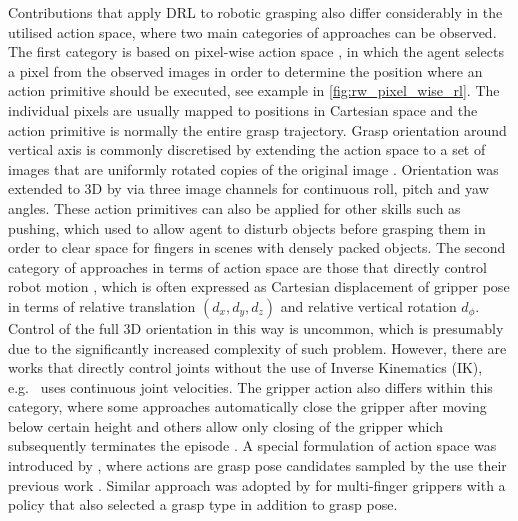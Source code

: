 Contributions that apply DRL to robotic grasping also differ considerably in the utilised action space, where two main categories of approaches can be observed. The first category is based on pixel-wise action space \cite{zeng_learning_2018, gualtieri_learning_2018, liu_active_2019, daniel_deep_2020, wu_generative_2020}, in which the agent selects a pixel from the observed images in order to determine the position where an action primitive should be executed, see example in \autoref{fig:rw_pixel_wise_rl}. The individual pixels are usually mapped to positions in Cartesian space and the action primitive is normally the entire grasp trajectory. Grasp orientation around vertical axis is commonly discretised by extending the action space to a set of images that are uniformly rotated copies of the original image \cite{zeng_learning_2018, daniel_deep_2020}. Orientation was extended to 3D by \citet{wu_generative_2020} via three image channels for continuous roll, pitch and yaw angles. These action primitives can also be applied for other skills such as pushing, which \citet{zeng_learning_2018} used to allow agent to disturb objects before grasping them in order to clear space for fingers in scenes with densely packed objects. The second category of approaches in terms of action space are those that directly control robot motion \cite{quillen_deep_2018, kalashnikov_qt-opt_2018, breyer_comparing_2019, joshi_robotic_2020, zhan_framework_2020, kim_acceleration_2020, iqbal_toward_2020}, which is often expressed as Cartesian displacement of gripper pose in terms of relative translation $(d_x, d_y, d_z)$ and relative vertical rotation $d_\phi$. Control of the full 3D orientation in this way is uncommon, which is presumably due to the significantly increased complexity of such problem. However, there are works that directly control joints without the use of Inverse Kinematics (IK), e.g.~\citet{popov_data-efficient_2017} uses continuous joint velocities. The gripper action also differs within this category, where some approaches automatically close the gripper after moving below certain height \cite{quillen_deep_2018} and others allow only closing of the gripper which subsequently terminates the episode \cite{kalashnikov_qt-opt_2018, joshi_robotic_2020}. A special formulation of action space was introduced by \citet{gualtieri_pick_2018}, where actions are grasp pose candidates sampled by the use their previous work \citet{ten_pas_grasp_2017}. Similar approach was adopted by \citet{osa_experiments_2017} for multi-finger grippers with a policy that also selected a grasp type in addition to grasp pose.


